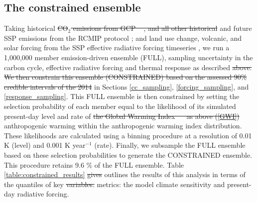 \documentclass[gmd, manuscript]{copernicus}
\providecommand{\DIFadd}[1]{{\protect\color{blue}#1}} %
\providecommand{\DIFdel}[1]{{\protect\color{red}\sout{#1}}}                      %
\providecommand{\DIFaddbegin}{} %
\providecommand{\DIFaddend}{} %
\providecommand{\DIFdelbegin}{} %
\providecommand{\DIFdelend}{} %
\begin{document}
\subsection{The constrained ensemble} \label{NROY_results}
Taking historical \DIFdelbegin \DIFdel{CO$_2$ emissions from GCP \mbox{%
\citep{Friedlingstein2019}}\hspace{0pt}%
, and all other historical }\DIFdelend and future SSP \citep{Riahi2017} emissions from the RCMIP protocol \citep{Nicholls2019}; and land use change, volcanic, and solar forcing from the SSP effective radiative forcing timeseries \citep{Smith2020c}, we run a 1,000,000 member emission-driven ensemble (FULL), sampling uncertainty in the carbon cycle, effective radiative forcing and thermal response as described \DIFdelbegin \DIFdel{above. We then constrain this ensemble (CONSTRAINED) based on the assessed 90\% credible intervals of the 2014 }\DIFdelend \DIFaddbegin \DIFadd{in Sections \ref{cc_sampling}, \ref{forcing_sampling}, and \ref{response_sampling}. This FULL ensemble is then constrained by setting the selection probability of each member equal to the likelihood of its simulated present-day }\DIFaddend level and rate of \DIFdelbegin \DIFdel{the Global Warming Index \mbox{%
\citep{Haustein2017} }\hspace{0pt}%
as above (\ref{GWI}) }\DIFdelend \DIFaddbegin \DIFadd{anthropogenic warming within the anthropogenic warming index distribution. These likelihoods are calculated using a binning procedure at a resolution of 0.01 K (level) and 0.001 K year$^{-1}$ (rate). Finally, we subsample the FULL ensemble based on these selection probabilities to generate the CONSTRAINED ensemble. This procedure retains 9.6 \% of the FULL ensemble}\DIFaddend . Table \ref{table:constrained_results} \DIFdelbegin \DIFdel{gives }\DIFdelend outlines the results of this analysis in terms of the quantiles of key \DIFdelbegin \DIFdel{variables.
}%
\DIFdelend \DIFaddbegin \DIFadd{metrics: the model climate sensitivity and present-day radiative forcing.
}\clearpage
\end{document}
